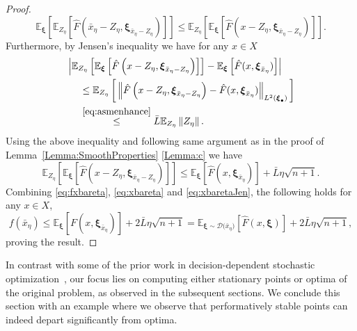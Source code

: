 \documentclass[11pt,reqno]{amsart}
\newcommand{\1}{{\bf 1}}
\newcommand{\2}{{\bf 2}}
\newcommand{\bxi}{\boldsymbol{\xi}}
\newcommand{\E}{\mathbb E}
\newcommand{\cd}{\mathcal D}
\numberwithin{equation}{section}
\theoremstyle{remark}
\begin{document}
{\begin{proof}
				\begin{equation}\label{eq:xbareta}
					\E_{\bxi}\left[\E_{Z_\eta}\left[\hat{F}\left(\bar{x}_\eta-Z_\eta, \bxi_{\bar{x}_\eta-Z_\eta}\right)\right] \right]\leq \E_{Z_\eta}\left[\E_{\bxi}\left[\hat{F}\left(x-Z_\eta, \bxi_{\bar{x}_\eta-Z_\eta}\right)\right] \right].
				\end{equation}	
				Furthermore, by Jensen's inequality we have for any $x \in X$%
				\begin{align*}
					& \left|\E_{Z_\eta}\left[\E_{\bxi}\left[\hat{F}\left(x-Z_\eta, \bxi_{\bar{x}_\eta-Z_\eta}\right)\right]\right]-\E_{\bxi}\left[\hat{F}(x,\bxi_{\bar{x}_\eta})\right]\right|  \\
					&~~~~ \leq \E_{Z_\eta}\left[\, \left\|\hat{F}\left(x-Z_\eta, \bxi_{\bar{x}_\eta-Z_\eta}\right)-\hat{F}(x,\bxi_{\bar{x}_\eta})\right\|_{L^2(\bxi_{\bullet})} \, \right] \\
					&~~~~ \overset{\eqref{eq:asmenhance}}{\leq} \bar{L}\E_{Z_\eta}\left\|Z_\eta\right\|.
				\end{align*}
				Using the above inequality and following same argument as in the proof of Lemma~\ref{Lemma:SmoothProperties} \eqref{Lemma:c} we have 
				\begin{equation}\label{eq:xbaretaJen}
					\E_{Z_\eta}\left[\E_{\bxi}\left[\hat{F}\left(x-Z_\eta, \bxi_{\bar{x}_\eta-Z_\eta}\right)\right]\right]\leq\E_{\bxi}\left[\hat{F}(x,\bxi_{\bar{x}_\eta})\right]+\bar{L}\eta \sqrt{n+1}.
				\end{equation}
				Combining \eqref{eq:fxbareta}, \eqref{eq:xbareta} and \eqref{eq:xbaretaJen}, the following holds for any $x \in X$,
			$$
			f(\bar{x}_\eta)\leq\E_{\bxi}\left[F(x,\bxi_{\bar{x}_\eta})\right]+2\bar{L}\eta \sqrt{n+1}=\E_{\bxi\sim{\cd(\bar{x}_\eta})}\left[\hat{F}(x,\bxi)\right]+2\bar{L}\eta \sqrt{n+1},
			$$
			proving the result.
			\end{proof}
			
			{In contrast with some of the prior work in decision-dependent stochastic optimization~\cite{drusvyatskiy2023stochastic},  our focus lies on computing either stationary points or optima of the original problem, as observed in the subsequent sections. We conclude this section with an example where we observe that performatively stable points can indeed depart significantly from optima.}
			
}
\end{document}
